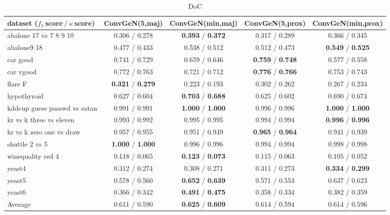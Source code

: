 
\begin{table*}[ht]\scriptsize\caption{DoC}\label{tab:results:DoC:A}\centering\tabularnewline
\begin{tabular}{l|@{\hskip3pt}c@{\hskip3pt}|@{\hskip3pt}c@{\hskip3pt}|@{\hskip3pt}c@{\hskip3pt}|@{\hskip3pt}c@{\hskip3pt}}\hline
\textbf{dataset ($f_1~$score$~/~\kappa~$score)} & \textbf{ConvGeN(5,maj)} & \textbf{ConvGeN(min,maj)} & \textbf{ConvGeN(5,prox)} & \textbf{ConvGeN(min,prox)}
\tabularnewline
\hline
abalone 17 vs 7 8 9 10 &  0.306  /  0.278  &  \textbf{0.393}  /  \textbf{0.372}  &  0.317  /  0.289  &  0.366  /  0.345 
\tabularnewline
abalone9 18 &  0.477  /  0.433  &  0.538  /  0.512  &  0.512  /  0.473  &  \textbf{0.549}  /  \textbf{0.525} 
\tabularnewline
car good &  0.741  /  0.729  &  0.659  /  0.646  &  \textbf{0.759}  /  \textbf{0.748}  &  0.577  /  0.558 
\tabularnewline
car vgood &  0.772  /  0.763  &  0.721  /  0.712  &  \textbf{0.776}  /  \textbf{0.766}  &  0.753  /  0.743 
\tabularnewline
flare F &  \textbf{0.321}  /  \textbf{0.279}  &  0.223  /  0.193  &  0.302  /  0.262  &  0.267  /  0.234 
\tabularnewline
hypothyroid &  0.627  /  0.604  &  \textbf{0.703}  /  \textbf{0.688}  &  0.625  /  0.602  &  0.690  /  0.674 
\tabularnewline
kddcup guess passwd vs satan &  0.991  /  0.991  &  \textbf{1.000}  /  \textbf{1.000}  &  0.996  /  0.996  &  \textbf{1.000}  /  \textbf{1.000} 
\tabularnewline
kr vs k three vs eleven &  0.993  /  0.992  &  0.995  /  0.995  &  0.994  /  0.994  &  \textbf{0.996}  /  \textbf{0.996} 
\tabularnewline
kr vs k zero one vs draw &  0.957  /  0.955  &  0.951  /  0.949  &  \textbf{0.965}  /  \textbf{0.964}  &  0.941  /  0.939 
\tabularnewline
shuttle 2 vs 5 &  \textbf{1.000}  /  \textbf{1.000}  &  0.996  /  0.996  &  0.994  /  0.994  &  0.998  /  0.998 
\tabularnewline
winequality red 4 &  0.118  /  0.065  &  \textbf{0.123}  /  \textbf{0.073}  &  0.115  /  0.063  &  0.105  /  0.052 
\tabularnewline
yeast4 &  0.312  /  0.274  &  0.308  /  0.271  &  0.311  /  0.273  &  \textbf{0.334}  /  \textbf{0.299} 
\tabularnewline
yeast5 &  0.578  /  0.560  &  \textbf{0.652}  /  \textbf{0.639}  &  0.571  /  0.553  &  0.637  /  0.623 
\tabularnewline
yeast6 &  0.366  /  0.342  &  \textbf{0.491}  /  \textbf{0.475}  &  0.358  /  0.334  &  0.382  /  0.359 
\tabularnewline
\hline Average &  0.611  /  0.590  &  \textbf{0.625}  /  \textbf{0.609}  &  0.614  /  0.594  &  0.614  /  0.596 
\tabularnewline
\hline\end{tabular}\end{table*}

